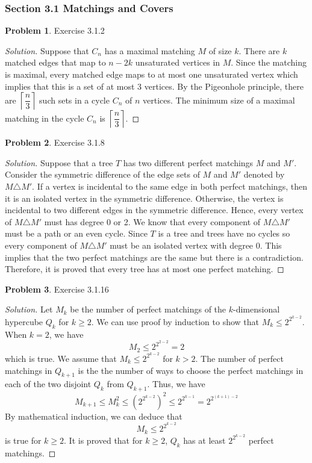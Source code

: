 \documentclass[12pt]{article}
\theoremstyle{definition}
\newtheorem{problem}{Problem}
\newenvironment*{solution}{\begin{proof}[Solution]}{\end{proof}}
\begin{document}
\subsubsection*{Section 3.1 Matchings and Covers}
\begin{problem}
    Exercise 3.1.2
\end{problem}
\begin{solution}
    Suppose that \(C_n\) has a maximal matching \(M\) of size \(k\). There are
    \(k\) matched edges that map to \(n-2k\) unsaturated vertices in \(M\).
    Since the matching is maximal, every matched edge maps to at most one
    unsaturated vertex which implies that this is a set of at most 3 vertices.
    By the Pigeonhole principle, there are
    \(\left\lceil \dfrac{n}{3} \right\rceil\) such sets in a cycle \(C_n\) of
    \(n\) vertices. The minimum size of a maximal matching in the cycle
    \(C_n\) is \(\left\lceil \dfrac{n}{3} \right\rceil\).
\end{solution}
\begin{problem}
    Exercise 3.1.8
\end{problem}
\begin{solution}
    Suppose that a tree \(T\) has two different perfect matchings \(M\) and
    \(M'\). Consider the symmetric difference of the edge sets of \(M\) and
    \(M'\) denoted by \(M\triangle M'\). If a vertex is incidental to the same
    edge in both perfect matchings, then it is an isolated vertex in the
    symmetric difference. Otherwise, the vertex is incidental to two different
    edges in the symmetric difference. Hence, every vertex of
    \(M\triangle M'\) must has degree 0 or 2. We know that every component of
    \(M\triangle M'\) must be a path or an even cycle. Since \(T\) is a tree
    and trees have no cycles so every component of \(M\triangle M'\) must be
    an isolated vertex with degree 0. This implies that the two perfect
    matchings are the same but there is a contradiction. Therefore, it is
    proved that every tree has at most one perfect matching.
\end{solution}
\begin{problem}
    Exercise 3.1.16
\end{problem}
\begin{solution}
    Let \(M_k\) be the number of perfect matchings of the \(k\)-dimensional
    hypercube \(Q_k\) for \(k\geq 2\). We can use proof by induction to show
    that \(M_k\leq 2^{2^{k-2}}\). When \(k=2\), we have
    \[M_2 \leq 2^{2^{2-2}} = 2\] which is true. We assume that
    \(M_k \leq 2^{2^{k-2}}\) for \(k>2\). The number of perfect matchings in
    \(Q_{k+1}\) is the the number of ways to choose the perfect matchings in
    each of the two disjoint \(Q_{k}\) from \(Q_{k+1}\). Thus, we have
    \[M_{k+1} \leq M^2_k \leq (2^{2^{k-2}})^2 \leq 2^{2^{k-1}}
    = 2^{2^{(k+1)-2}}\] By mathematical induction, we can deduce that
    \[M_k \leq 2^{2^{k-2}}\] is true for \(k\geq2\). It is proved that for
    \(k\geq2\), \(Q_k\) has at least \(2^{2^{k-2}}\) perfect matchings.
\end{solution}
\end{document}
